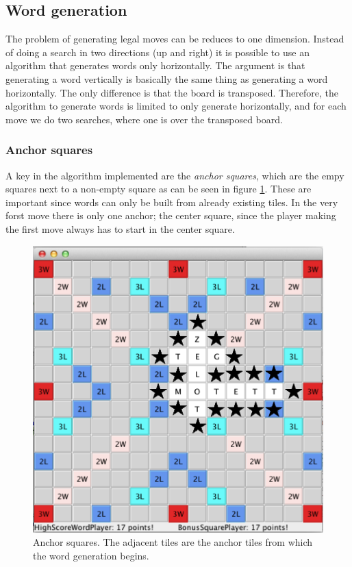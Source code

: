 \documentclass[a4paper, 12pt]{report}
\begin{document}
\subsection{Word generation}
The problem of generating legal moves can be reduces to one dimension. Instead of doing a search in two directions (up and right) it is possible to use an algorithm that generates words only horizontally. The argument is that generating a word vertically is basically the same thing as generating a word horizontally. The only difference is that the board is transposed. Therefore, the algorithm to generate words is limited to only generate horizontally, and for each move we do two searches, where one is over the transposed board.

\subsubsection{Anchor squares}
A key in the algorithm implemented are the \emph{anchor squares}, which are the empy squares next to a non-empty square as can be seen in figure \ref{fig:anchors}. These are important since words can only be built from already existing tiles. In the very forst move there is only one anchor; the center square, since the player making the first move always has to start in the center square.

\begin{figure}[h]
\centering
\includegraphics[scale=0.5]{anchors}
\caption{Anchor squares. The adjacent tiles are the anchor tiles from which the word generation begins.}
\label{fig:anchors}
\end{figure}
\end{document}
